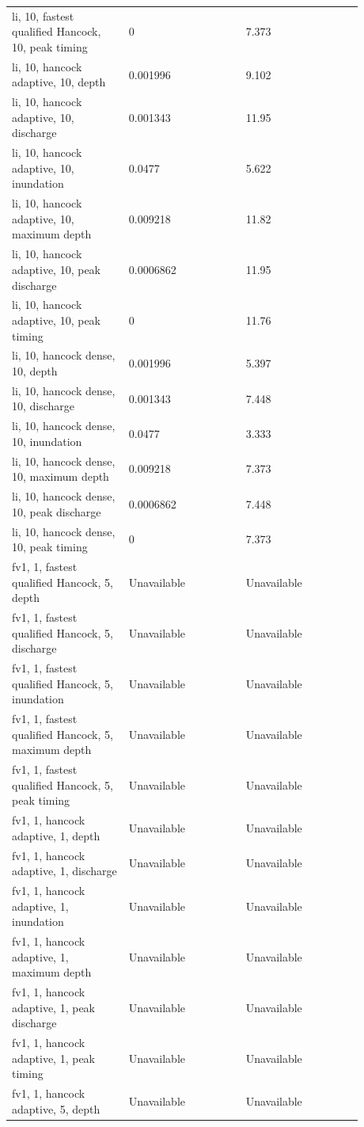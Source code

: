 \begin{longtable}{p{0.2933\linewidth}p{0.2933\linewidth}p{0.2933\linewidth}}
li, 10, fastest qualified Hancock, 10, peak timing & 0 & 7.373 \\
li, 10, hancock adaptive, 10, depth & 0.001996 & 9.102 \\
li, 10, hancock adaptive, 10, discharge & 0.001343 & 11.95 \\
li, 10, hancock adaptive, 10, inundation & 0.0477 & 5.622 \\
li, 10, hancock adaptive, 10, maximum depth & 0.009218 & 11.82 \\
li, 10, hancock adaptive, 10, peak discharge & 0.0006862 & 11.95 \\
li, 10, hancock adaptive, 10, peak timing & 0 & 11.76 \\
li, 10, hancock dense, 10, depth & 0.001996 & 5.397 \\
li, 10, hancock dense, 10, discharge & 0.001343 & 7.448 \\
li, 10, hancock dense, 10, inundation & 0.0477 & 3.333 \\
li, 10, hancock dense, 10, maximum depth & 0.009218 & 7.373 \\
li, 10, hancock dense, 10, peak discharge & 0.0006862 & 7.448 \\
li, 10, hancock dense, 10, peak timing & 0 & 7.373 \\
fv1, 1, fastest qualified Hancock, 5, depth & Unavailable & Unavailable \\
fv1, 1, fastest qualified Hancock, 5, discharge & Unavailable & Unavailable \\
fv1, 1, fastest qualified Hancock, 5, inundation & Unavailable & Unavailable \\
fv1, 1, fastest qualified Hancock, 5, maximum depth & Unavailable & Unavailable \\
fv1, 1, fastest qualified Hancock, 5, peak timing & Unavailable & Unavailable \\
fv1, 1, hancock adaptive, 1, depth & Unavailable & Unavailable \\
fv1, 1, hancock adaptive, 1, discharge & Unavailable & Unavailable \\
fv1, 1, hancock adaptive, 1, inundation & Unavailable & Unavailable \\
fv1, 1, hancock adaptive, 1, maximum depth & Unavailable & Unavailable \\
fv1, 1, hancock adaptive, 1, peak discharge & Unavailable & Unavailable \\
fv1, 1, hancock adaptive, 1, peak timing & Unavailable & Unavailable \\
fv1, 1, hancock adaptive, 5, depth & Unavailable & Unavailable \\

\end{longtable}

